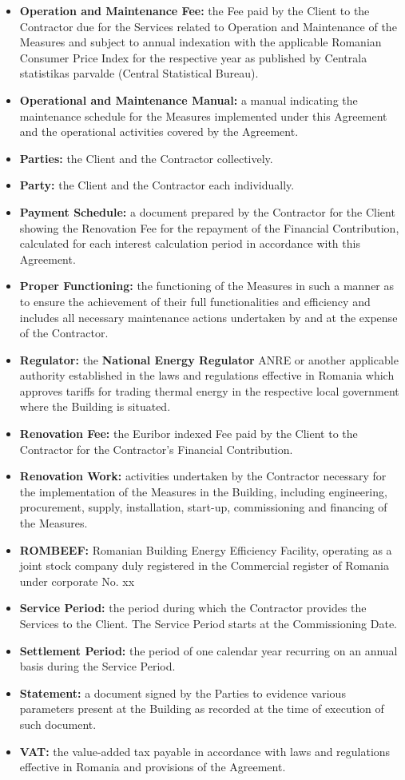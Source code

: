 \begin{multicols}{2}
\begin{itemize}[label={}]
	\item\textbf{Operation and Maintenance Fee:} the Fee paid by the Client to the Contractor due for the Services related to Operation and Maintenance of the Measures and subject to annual indexation with the applicable Romanian Consumer Price Index for the respective year as published by Centrala statistikas parvalde (Central Statistical Bureau).
	\item\textbf{Operational and Maintenance Manual:}  a manual indicating the maintenance schedule for the Measures implemented under this Agreement and the operational activities covered by the Agreement.
	\item\textbf{Parties:} the Client and the Contractor collectively.
	\item\textbf{Party:} the Client and the Contractor each individually.
	\item\textbf{Payment Schedule:} a document prepared by the Contractor for the Client showing the Renovation Fee for the repayment of the Financial Contribution, calculated for each interest calculation period in accordance with this Agreement.
	\item\textbf{Proper Functioning:} the functioning of the Measures in such a manner as to ensure the achievement of their full functionalities and efficiency and includes all necessary maintenance actions undertaken by and at the expense of the Contractor.
	\item\textbf{Regulator:} the \textbf{National Energy Regulator} ANRE or another applicable authority established in the laws and regulations effective in Romania which approves tariffs for trading thermal energy in the respective local government where the Building is situated.
	\item\textbf{Renovation Fee:} the Euribor indexed Fee paid by the Client to the Contractor for the Contractor’s Financial Contribution.
	\item\textbf{Renovation Work:} activities undertaken by the Contractor necessary for the implementation of the Measures in the Building, including engineering, procurement, supply, installation, start-up, commissioning and financing of the Measures.
        \item\textbf{ROMBEEF:} Romanian Building Energy Efficiency Facility, operating as a joint stock company duly registered in the Commercial register of Romania under corporate No. xx
	\item\textbf{Service Period:} the period during which the Contractor provides the Services to the Client. The Service Period starts at the Commissioning Date.
	\item\textbf{Settlement Period:} the period of one calendar year recurring on an annual basis during the Service Period.
	\item\textbf{Statement:} a document signed by the Parties to evidence various parameters present at the Building as recorded at the time of execution of such document.
	\item\textbf{VAT:} the value-added tax payable in accordance with laws and regulations effective in Romania and provisions of the Agreement.
\end{itemize}


\end{multicols}
